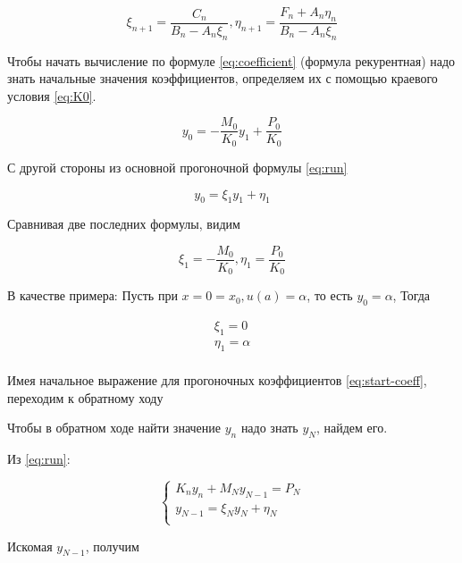 \begin{equation}\label{eq:coefficient}
    \xi_{n+1} = \frac{C_n}{B_n - A_n \xi_n},
    \eta_{n+1} = \frac{F_n + A_n \eta_n}{B_n - A_n \xi_n}
\end{equation}

Чтобы начать вычисление по формуле \ref{eq:coefficient}
(формула рекурентная) надо знать начальные значения коэффициентов,
определяем их с помощью краевого условия \ref{eq:K0}.

\begin{equation*}
    y_0 = -\frac{M_0}{K_0} y_1 + \frac{P_0}{K_0}
\end{equation*}

С другой стороны из основной прогоночной формулы \ref{eq:run}

\begin{equation*}
    y_0 = \xi_1 y_1 + \eta_1
\end{equation*}

Сравнивая две последних формулы, видим

\begin{equation}\label{eq:start-coeff}
    \xi_1 = -\frac{M_0}{K_0}, \eta_1 = \frac{P_0}{K_0}
\end{equation}

В качестве примера: Пусть при $x = 0 = x_0, u(a) = \alpha$, то есть
$y_0 = \alpha$, Тогда

\begin{equation*}
    \begin{matrix}
        \xi_1 = 0 \\
        \eta_1 = \alpha \\
    \end{matrix}
\end{equation*}

Имея начальное выражение для прогоночных коэффициентов \ref{eq:start-coeff},
переходим к обратному ходу

Чтобы в обратном ходе найти значение $y_n$ надо знать $y_N$, найдем его.

Из \ref{eq:run}:

\begin{equation*}
    \begin{cases}
        K_n y_n + M_N y_{N-1} = P_N \\
        y_{N-1} = \xi_N y_N + \eta_N \\
    \end{cases}
\end{equation*}

Искомая $y_{N-1}$, получим

